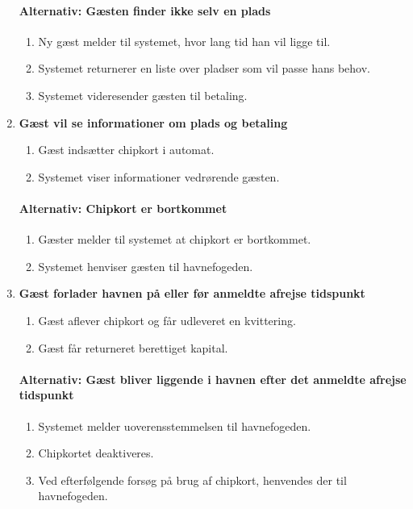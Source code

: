 \begin{enumerate}
    \paragraph{Alternativ: Gæsten finder ikke selv en plads}
      \begin{enumerate}
        \item Ny gæst melder til systemet, hvor lang tid han vil ligge til.
        \item Systemet returnerer en liste over pladser som vil passe hans behov.
        \item Systemet videresender gæsten til betaling.

      \end{enumerate}

    \item{\bf{Gæst vil se informationer om plads og betaling}}
      \begin{enumerate}
        \item Gæst indsætter chipkort i automat.
        \item Systemet viser informationer vedrørende gæsten.
      \end{enumerate}

    \paragraph{Alternativ: Chipkort er bortkommet}
      \begin{enumerate}
        \item Gæster melder til systemet at chipkort er bortkommet.
        \item Systemet henviser gæsten til havnefogeden.
      \end{enumerate}


    \item{\bf{Gæst forlader havnen på eller før anmeldte afrejse tidspunkt}}
      \begin{enumerate}
        \item Gæst aflever chipkort og får udleveret en kvittering.
        \item Gæst får returneret berettiget kapital.
      \end{enumerate}

    \paragraph{Alternativ: Gæst bliver liggende i havnen efter det anmeldte afrejse tidspunkt}
      \begin{enumerate}
        \item Systemet melder uoverensstemmelsen til havnefogeden.
        \item Chipkortet deaktiveres.
        \item Ved efterfølgende forsøg på brug af chipkort, henvendes der til havnefogeden.
      \end{enumerate}



\end{enumerate}
